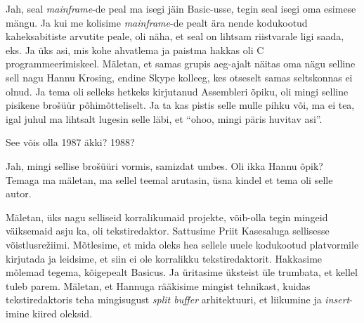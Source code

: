 
Jah, seal \emph{mainframe}-de peal ma isegi jäin Basic-usse, tegin seal isegi 
oma esimese mängu. Ja kui me kolisime  \emph{mainframe}-de pealt ära nende 
kodukootud kaheksabitiste arvutite peale, oli näha, et seal on lihtsam  
riistvarale ligi saada, eks. Ja üks asi, mis kohe ahvatlema ja paistma hakkas 
oli C programmeerimiskeel.  Mäletan, et samas grupis aeg-ajalt 
näitas oma nägu selline sell nagu Hannu Krosing, 
endine Skype kolleeg, kes  otseselt samas seltskonnas ei olnud. Ja tema oli 
selleks hetkeks  kirjutanud Assembleri õpiku, oli mingi selline pisikene 
brošüür põhimõtteliselt.  Ja ta kas pistis selle mulle pihku või, ma ei tea, 
igal juhul ma lihtsalt lugesin selle läbi, et \enquote{ohoo, mingi päris 
huvitav asi}. 


See võis olla 1987 äkki? 1988?


Jah, mingi sellise brošüüri vormis, 
samizdat umbes. 
Oli ikka Hannu õpik? Temaga ma mäletan, ma sellel teemal arutasin,  üsna kindel 
et tema oli selle autor.


Mäletan, üks nagu selliseid korralikumaid projekte, võib-olla tegin mingeid 
väiksemaid asju ka, oli tekstiredaktor\label{sisu!jaani_tekstiredaktor}. 
Sattusime Priit Kasesaluga sellisesse 
võistlusrežiimi. Mõtlesime, et mida oleks hea sellele uuele kodukootud 
platvormile kirjutada ja leidsime, et siin ei ole korralikku tekstiredaktorit. 
Hakkasime mõlemad tegema, kõigepealt Basicus. Ja üritasime 
üksteist üle trumbata, et kellel tuleb parem. Mäletan, et 
Hannuga rääkisime  mingist tehnikast, kuidas 
tekstiredaktoris teha  mingisugust \emph{split buffer} arhitektuuri, et 
liikumine ja \emph{insert}-imine kiired oleksid.

